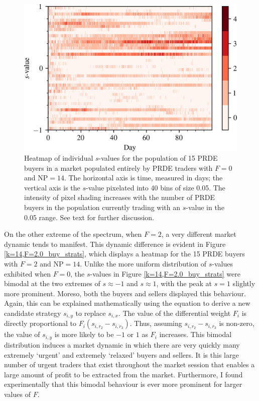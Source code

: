 \documentclass[conference]{IEEEtran}
\begin{document}
\begin{figure}[htbp]
    \centerline{\includegraphics[width=\columnwidth]{k=14,F=0.0_buy_strats.png}}
    \caption{
        Heatmap of individual $s$-values for the population of 15 PRDE buyers in a market populated entirely by PRDE traders with $F=0$ and $\mathrm{NP}=14$.
        The horizontal axis is time, measured in days; the vertical axis is the $s$-value pixelated into 40 bins of size 0.05.
        The intensity of pixel shading increases with the number of PRDE buyers in the population currently trading with an $s$-value in the 0.05 range.
        See text for further discussion.
    }
    \label{k=14,F=0.0_buy_strats}
\end{figure}

On the other extreme of the spectrum, when $F=2$, a very different market dynamic tends to manifest.
This dynamic difference is evident in Figure \ref{k=14,F=2.0_buy_strats}, which displays a heatmap for the 15 PRDE buyers with $F=2$ and $\mathrm{NP}=14$.
Unlike the more uniform distribution of $s$-values exhibited when $F=0$, the $s$-values in Figure \ref{k=14,F=2.0_buy_strats} were bimodal at the two extremes of $s\approx-1$ and $s\approx1$, with the peak at $s=1$ slightly more prominent.
Moreso, both the buyers and sellers displayed this behaviour.
Again, this can be explained mathematically using the equation to derive a new candidate strategy $s_{i,y}$ to replace $s_{i,x}$.
The value of the differential weight $F_i$ is directly proportional to $F_i(s_{i,r_2}-s_{i,r_3})$.
Thus, assuming $s_{i,r_2}-s_{i,r_3}$ is non-zero, the value of $s_{i,y}$ is more likely to be $-1$ or $1$ as $F_i$ increases.
This bimodal distribution induces a market dynamic in which there are very quickly many extremely `urgent' and extremely `relaxed' buyers and sellers.
It is this large number of urgent traders that exist throughout the market session that enables a large amount of profit to be extracted from the market.
Furthermore, I found experimentally that this bimodal behaviour is ever more prominent for larger values of $F$.
\end{document}
